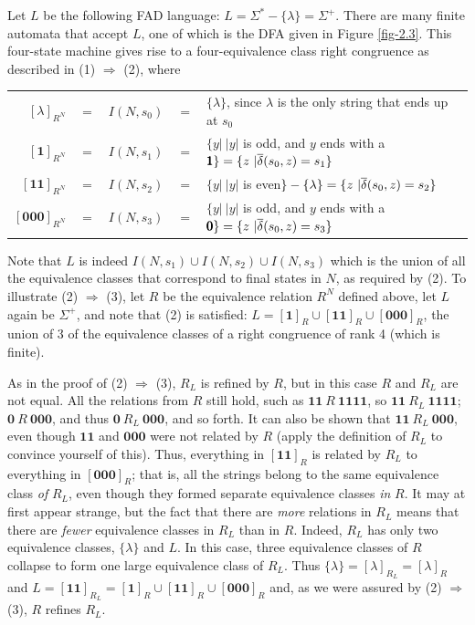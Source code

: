 Let $L$ be the following FAD language: $L=\Sigma^* - \{\lambda\} = \Sigma^+$.
There are many finite automata that accept $L$, one of which is the DFA given in
Figure \ref{fig-2.3}. This four-state machine gives rise to a four-equivalence class right
congruence as described in (1) $\Rightarrow$ (2), where
\begin{center}\begin{tabular}{rclcl}
$[\lambda]_{R^N}$ & $=$ & $I(N,s_0)$ & $=$ & $\{\lambda\}$, since $\lambda$ is
	the only string that ends up at $s_0$ \\
$[\pmb{1}]_{R^N}$ & $=$ & $I(N,s_1)$ & $=$ & $\{y|\ |y|$ is odd, and $y$ ends
	with a $\pmb{1}\} = \{z\ |\overline{\delta}(s_0,z) = s_1\}$ \\
$[\pmb{11}]_{R^N}$ & $=$ & $I(N,s_2)$ & $=$ & $\{y|\ |y|$ is even$\}-\{\lambda\}
	= \{z\ |\overline{\delta}(s_0,z) = s_2\}$ \\
$[\pmb{000}]_{R^N}$ & $=$ & $I(N,s_3)$ & $=$ & $\{y|\ |y|$ is odd, and $y$ ends
	with a $\pmb{0}\} = \{z\ |\overline{\delta}(s_0,z) = s_3\}$
\end{tabular}\end{center}
Note that $L$ is indeed $I(N,s_1) \cup I(N,s_2)  \cup I(N,s_3)$ which is the
union of all the equivalence classes that correspond to final states in $N$, as
required by (2). To illustrate (2) $\Rightarrow$ (3), let $R$ be the equivalence
relation $R^N$ defined above, let $L$ again be $\Sigma^+$, and note that (2) is
satisfied: $L=[\pmb{1}]_R \cup [\pmb{11}]_R \cup [\pmb{000}]_R$, the union of
3 of the equivalence classes of a right congruence of rank 4 (which is finite).

As in the proof of (2) $\Rightarrow$ (3), $R_L$ is refined by $R$, but in this
case $R$ and $R_L$ are not equal. All the relations from $R$ still hold, such as
$\pmb{11}\ R\ \pmb{1111}$, so $\pmb{11}\ R_L\ \pmb{1111}$; $\pmb{0}\ R\ 
\pmb{000}$, and thus $\pmb{0}\ R_L\ \pmb{000}$, and so forth. It can also be
shown that $\pmb{11}\ R_L\ \pmb{000}$, even though $\pmb{11}$ and $\pmb{000}$
were not related by $R$ (apply the definition of $R_L$ to convince yourself of
this). Thus, everything in $[\pmb{11}]_R$ is related by $R_L$ to everything in
$[\pmb{000}]_R$; that is, all the strings belong to the same equivalence class
\emph{of} $R_L$, even though they formed separate equivalence classes \emph{in}
$R$. It may at first appear strange, but the fact that there are \emph{more} relations
in $R_L$ means that there are \emph{fewer} equivalence classes in $R_L$ than in
$R$. Indeed, $R_L$ has only two equivalence classes, $\{\lambda\}$ and $L$. In
this case, three equivalence classes of $R$ collapse to form one large
equivalence class of $R_L$. Thus $\{\lambda\}=[\lambda]_{R_L}=[\lambda]_R$ and
$L=[\pmb{11}]_{R_L}=[\pmb{1}]_R \cup [\pmb{11}]_R \cup [\pmb{000}]_R$ and, as we
were assured by (2) $\Rightarrow$ (3), $R$ refines $R_L$.


